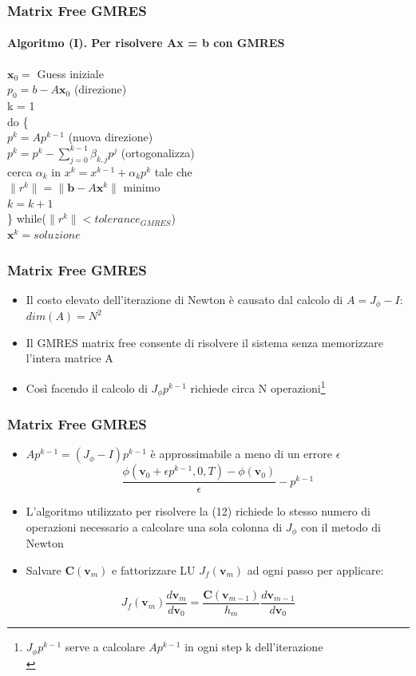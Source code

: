 \documentclass[10pt]{beamer}
\begin{document}
\begin{frame}
\frametitle{Matrix Free GMRES}\framesubtitle{\textbf{Algoritmo (I)}. Per risolvere Ax = b con GMRES}
$\mathbf{x}_0 =$ Guess iniziale\\
$p_0 = b - A\mathbf{x}_0$ (direzione)\\
k = 1\\
do \{\\
$p^k = Ap^{k-1}$ (nuova direzione)\\
$p^k = p^k -\sum\limits_{j=0}^{k-1}\beta_{k,j}p^j$ (ortogonalizza)\\
cerca $\alpha_k$ in $x^k = x^{k -1} + \alpha_kp^k$ tale che\\
$\|r^k\| = \|\mathbf{b} - A\mathbf{x}^k\|$ minimo\\
$k = k + 1$\\
\} while($\|r^k\| < tolerance_{GMRES}$)\\
$\mathbf{x}^k = soluzione$
\end{frame}


\begin{frame}
\frametitle{Matrix Free GMRES}
\begin{itemize}
\item Il costo elevato dell'iterazione di Newton è causato dal calcolo di $ A = J_\phi - I$: $dim(A) = N^2$
\item Il GMRES matrix free consente di risolvere il sistema senza memorizzare l'intera matrice A  
\item 
Così facendo il calcolo di $J_\phi p^{k-1}$ richiede circa N operazioni\footnote{$J_\phi p^{k-1}$ serve a calcolare $Ap^{k-1}$ in ogni step k dell'iterazione \\}
\end{itemize}
\end{frame}


\begin{frame}
\frametitle{Matrix Free GMRES}
\begin{itemize}
\item $Ap^{k-1} = (J_\phi - I)p^{k-1}$ è approssimabile a meno di un errore $\epsilon$ \\\begin{equation} \frac{\phi(\mathbf{v}_0 + \epsilon p^{k-1},0,T) - \phi (\mathbf{v}_0)}{\epsilon} - p^{k-1}
\tag{12}
\end{equation}
\item L'algoritmo utilizzato per risolvere la (12) richiede lo stesso numero di operazioni necessario a calcolare una sola colonna di $J_\phi$ con il metodo di Newton
\item Salvare $\mathbf{C}(\mathbf{v}_m)$ e fattorizzare LU $J_f(\mathbf{v}_m)$ ad ogni passo per applicare:
\end{itemize}
\begin{equation}
J_f(\mathbf{v}_m)\frac{d\mathbf{v}_m}{d\mathbf{v}_0} = \frac{\mathbf{C}(\mathbf{v}_{m-1})}{h_m}\frac{d\mathbf{v}_{m-1}}{d\mathbf{v}_0}
\tag{11}
\end{equation}  
\end{frame}
\end{document}

